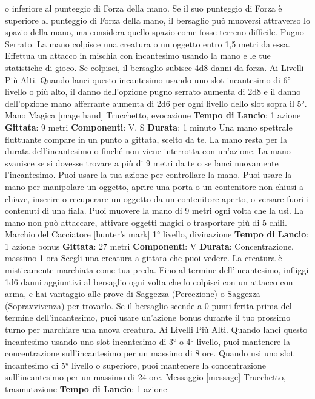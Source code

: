 \begin{multicols}{2}
o inferiore al punteggio di Forza della mano. Se il suo
punteggio di Forza è superiore al punteggio di Forza
della mano, il bersaglio può muoversi attraverso lo
spazio della mano, ma considera quello spazio come
fosse terreno difficile.
Pugno Serrato. La mano colpisce una creatura o un
oggetto entro 1,5 metri da essa. Effettua un attacco in
mischia con incantesimo usando la mano e le tue
statistiche di gioco. Se colpisci, il bersaglio subisce 4d8
danni da forza.
Ai Livelli Più Alti. Quando lanci questo incantesimo
usando uno slot incantesimo di 6° livello o più alto, il
danno dell’opzione pugno serrato aumenta di 2d8 e il
danno dell’opzione mano afferrante aumenta di 2d6 per
ogni livello dello slot sopra il 5°.
Mano Magica
[mage hand]
Trucchetto, evocazione
\textbf{Tempo di Lancio}: 1 azione
\textbf{Gittata}: 9 metri
\textbf{Componenti}: V, S
\textbf{Durata}: 1 minuto
Una mano spettrale fluttuante compare in un punto a
gittata, scelto da te. La mano resta per la durata
dell’incantesimo o finché non viene interrotta con
un’azione. La mano svanisce se si dovesse trovare a
più di 9 metri da te o se lanci nuovamente
l’incantesimo.
Puoi usare la tua azione per controllare la mano. Puoi
usare la mano per manipolare un oggetto, aprire una
porta o un contenitore non chiusi a chiave, inserire o
recuperare un oggetto da un contenitore aperto, o
versare fuori i contenuti di una fiala. Puoi muovere la
mano di 9 metri ogni volta che la usi.
La mano non può attaccare, attivare oggetti magici o
trasportare più di 5 chili.
Marchio del Cacciatore
[hunter’s mark]
1° livello, divinazione
\textbf{Tempo di Lancio}: 1 azione bonus
\textbf{Gittata}: 27 metri
\textbf{Componenti}: V
\textbf{Durata}: Concentrazione, massimo 1 ora
Scegli una creatura a gittata che puoi vedere. La
creatura è misticamente marchiata come tua preda.
Fino al termine dell’incantesimo, infliggi 1d6 danni
aggiuntivi al bersaglio ogni volta che lo colpisci con un
attacco con arma, e hai vantaggio alle prove di
Saggezza (Percezione) o Saggezza (Sopravvivenza)
per trovarlo. Se il bersaglio scende a 0 punti ferita prima
del termine dell’incantesimo, puoi usare un’azione
bonus durante il tuo prossimo turno per marchiare una
nuova creatura.
Ai Livelli Più Alti. Quando lanci questo incantesimo
usando uno slot incantesimo di 3° o 4° livello, puoi
mantenere la concentrazione sull’incantesimo per un
massimo di 8 ore. Quando usi uno slot incantesimo di
5° livello o superiore, puoi mantenere la concentrazione
sull’incantesimo per un massimo di 24 ore.
Messaggio
[message]
Trucchetto, trasmutazione
\textbf{Tempo di Lancio}: 1 azione

\end{multicols}
